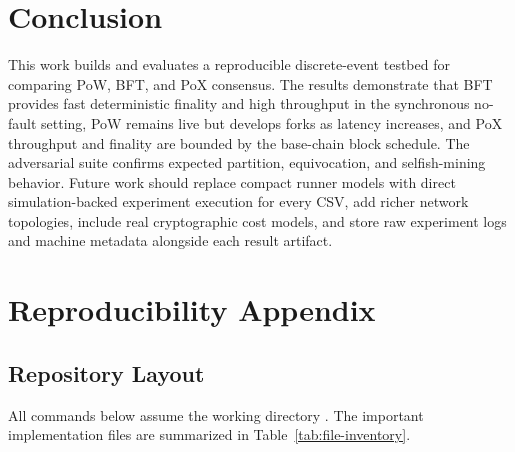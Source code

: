 \documentclass[11pt]{article}
\begin{document}
\section{Conclusion}

This work builds and evaluates a reproducible discrete-event testbed for comparing PoW, BFT, and PoX consensus. The results demonstrate that BFT provides fast deterministic finality and high throughput in the synchronous no-fault setting, PoW remains live but develops forks as latency increases, and PoX throughput and finality are bounded by the base-chain block schedule. The adversarial suite confirms expected partition, equivocation, and selfish-mining behavior. Future work should replace compact runner models with direct simulation-backed experiment execution for every CSV, add richer network topologies, include real cryptographic cost models, and store raw experiment logs and machine metadata alongside each result artifact.

\appendix
\section{Reproducibility Appendix}

\subsection{Repository Layout}

All commands below assume the working directory . The important implementation files are summarized in Table~\ref{tab:file-inventory}.
\end{document}
